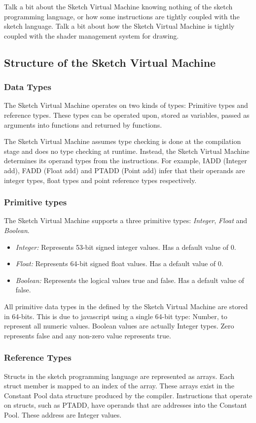 \documentclass{l3proj}
\begin{document}
Talk a bit about the Sketch Virtual Machine knowing nothing of the sketch programming language, or how some instructions are tightly coupled with the sketch language.
Talk a bit about how the Sketch Virtual Machine is tightly coupled with the shader management system for drawing.

\subsection{Structure of the Sketch Virtual Machine}

\subsubsection{Data Types}
The Sketch Virtual Machine operates on two kinds of types: Primitive types and reference types. These types can be operated upon, stored as variables, passed as arguments into functions and returned by functions. 

The Sketch Virtual Machine assumes type checking is done at the compilation stage and does no type checking at runtime. Instead, the Sketch Virtual Machine determines its operand types from the instructions. For example, IADD (Integer add), FADD (Float add) and PTADD (Point add) infer that their operands are integer types, float types and point reference types respectively. 

\subsubsection{Primitive types}
The Sketch Virtual Machine supports a three primitive types: \textit{Integer}, \textit{Float} and \textit{Boolean}.
\begin{itemize}
	\item \textit{Integer:} Represents 53-bit signed integer values. Has a default value of 0. 
	\item \textit{Float:} Represents 64-bit signed float values. Has a default value of 0.
	\item \textit{Boolean:} Represents the logical values true and false. Has a default value of false.
\end{itemize}
All primitive data types in the defined by the Sketch Virtual Machine are stored in 64-bits. This is due to javascript using a single 64-bit type: Number, to represent all numeric values. Boolean values are actually Integer types. Zero represents false and any non-zero value represents true.

\subsubsection{Reference Types}
Structs in the sketch programming language are represented as arrays. Each struct member is mapped to an index of the array. These arrays exist in the Constant Pool data structure produced by the compiler. Instructions that operate on structs, such as PTADD, have operands that are addresses into the Constant Pool. These address are Integer values.
\end{document}
